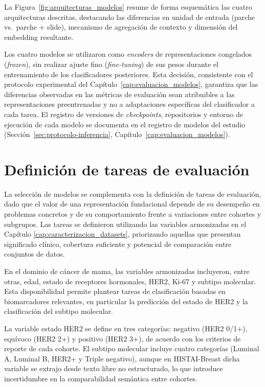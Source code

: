 La Figura~\ref{fig:arquitecturas_modelos} resume de forma esquemática las
cuatro arquitecturas descritas, destacando las diferencias en unidad de
entrada (parche vs.\ parche + slide), mecanismo de agregación de contexto y
dimensión del embedding resultante.



Los cuatro modelos se utilizaron como \textit{encoders} de representaciones congelados (\textit{frozen}), sin realizar ajuste fino (\textit{fine-tuning}) de sus pesos durante el entrenamiento de los clasificadores posteriores. Esta decisión, consistente con el protocolo experimental del Capítulo~\ref{cap:evaluacion_modelos}, garantiza que las diferencias observadas en las métricas de evaluación sean atribuibles a las representaciones preentrenadas y no a adaptaciones específicas del clasificador a cada tarea. El registro de versiones de \textit{checkpoints}, repositorios y entorno de ejecución de cada modelo se documenta en el registro de modelos del estudio (Sección~\ref{sec:protocolo-inferencia}, Capítulo~\ref{cap:evaluacion_modelos}).

\section{Definición de tareas de evaluación}
\label{sec:definicion_tareas}

La selección de modelos se complementa con la definición de tareas de evaluación, dado que el valor de una representación fundacional depende de su desempeño en problemas concretos y de su comportamiento frente a variaciones entre cohortes y subgrupos. Las tareas se definieron utilizando las variables armonizadas en el Capítulo \ref{cap:caracterizacion_datasets}, priorizando aquellas que presentan significado clínico, cobertura suficiente y potencial de comparación entre conjuntos de datos.

En el dominio de cáncer de mama, las variables armonizadas incluyeron, entre otras, edad, estado de receptores hormonales, HER2, Ki-67 y subtipo molecular. Esta disponibilidad permite plantear tareas de clasificación basadas en biomarcadores relevantes, en particular la predicción del estado de HER2 y la clasificación del subtipo molecular.

La variable estado HER2 se define en tres categorías: negativo (HER2 0/1+), equívoco (HER2 2+) y positivo (HER2 3+), de acuerdo con los criterios de reporte de cada cohorte. El subtipo molecular incluye cuatro categorías (Luminal A, Luminal B, HER2+ y Triple negativo), aunque en HISTAI-Breast dicha variable se extrajo desde texto libre no estructurado, lo que introduce incertidumbre en la comparabilidad semántica entre cohortes.

